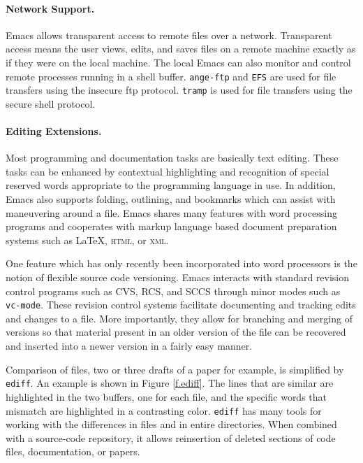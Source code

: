 \documentclass{article}
\newcommand{\stexttt}[1]{{\small\texttt{#1}}}
\begin{document}
\paragraph{Network Support.}
Emacs allows transparent access to remote files over a network.
Transparent access means the user views, edits, and saves files on a
remote machine exactly as if they were on the local machine.  The local Emacs
can also monitor and control remote processes running in a
shell buffer.  \stexttt{ange-ftp} and \stexttt{EFS}
are used for file transfers using the insecure ftp protocol.
\stexttt{tramp} is used for file transfers using the secure shell
protocol.

\paragraph{Editing Extensions.}
Most programming and documentation tasks are basically text editing.
These tasks can be enhanced by contextual highlighting and recognition
of special reserved words appropriate to the programming language in
use.  In addition, Emacs also supports folding, outlining, and
bookmarks which can assist with maneuvering around a file.  Emacs
shares many features with word processing programs and cooperates with
markup language based document preparation systems such as \LaTeX,
\textsc{html}, or \textsc{xml}.

One feature which has only recently been incorporated into word
processors is the notion of flexible source code versioning.  Emacs
interacts with standard revision control programs such as CVS,
RCS, and SCCS through minor modes such as \stexttt{vc-mode}.
These revision control systems facilitate documenting and
tracking edits and changes to a file.
More importantly, they allow for branching and
merging of versions so that material present in an older version of
the file can be recovered and inserted into a newer version in a
fairly easy manner.

Comparison of files, two or three drafts of a paper for example, is
simplified by \stexttt{ediff}.  An example is shown in Figure
\ref{f.ediff}.  The lines that are similar are highlighted in the two
buffers, one for each file, and the specific words that mismatch are
highlighted in a contrasting color.  \stexttt{ediff} has many tools
for working with the differences in files and in entire directories.
When combined with a source-code repository, it allows reinsertion of
deleted sections of code files, documentation, or papers.
\end{document}
